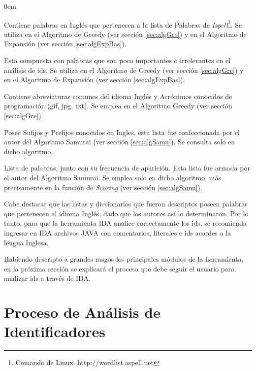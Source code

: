 \begin{description}
\itemsep0em%

\item[Diccionario en Inglés (ispell):] Contiene palabras en Inglés que pertenecen a la lista de Palabras de \textit{Ispell}\footnote[4]{Comando de Linux. http://wordlist.aspell.net}. Se utiliza en el Algoritmo de Greedy (ver sección \ref{sec:algGre}) y en el Algoritmo de Expansión (ver sección \ref{sec:algExpBas}).

\item[Lista de Palabras Excluyentes (stop-list):] Esta compuesta con palabras que son poco importantes o irrelevantes en el análisis de ids. Se utiliza en el Algoritmo de Greedy (ver sección \ref{sec:algGre}) y en el Algoritmo de Expansión (ver sección \ref{sec:algExpBas}).

\item[Lista de Abreviaturas y Acrónimos Conocidas:] Contiene abreviaturas comunes del idioma Inglés y Acrónimos conocidos de programación (gif, jpg, txt). Se emplea en el Algoritmo Greedy (ver sección \ref{sec:algGre}).

\item[Lista de Prefijos y Sufijos Conocidos:] Posee Sufijos y Prefijos conocidos en Ingles, esta lista fue confeccionada por el autor del Algoritmo Samurai (ver sección \ref{sec:algSamu}). Se consulta solo en dicho algoritmo.

\item[Frecuencias Globales de Palabras:] Lista de palabras, junto con su frecuencia de aparición. Esta lista fue armada por el autor del Algoritmo Samurai. Se emplea solo en dicho algoritmo, más precisamente en la función de \textit{Scoring} (ver sección \ref{sec:algSamu}).

\end{description}

Cabe destacar que las listas y diccionarios que fueron descriptos poseen palabras que pertenecen al idioma Inglés, dado que los autores así lo determinaron. Por lo tanto, para que la herramienta IDA analice correctamente los ids, se recomienda ingresar en IDA archivos JAVA con comentarios, literales e ids acordes a la lengua Inglesa. 

Habiendo descripto a grandes rasgos los principales módulos de la herramienta, en la próxima sección se explicará el proceso que debe seguir el usuario para analizar ids a través de IDA.
 
\section{Proceso de Análisis de Identificadores}

